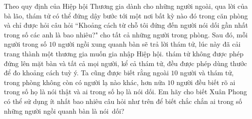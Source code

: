 \begin{multicols}{2}
\begin{figure}[H]
		\vspace*{-15pt}
	\end{figure}
	Theo quy định của Hiệp hội Thương gia dành cho những người ngoài, qua lời của bà lão, thám tử có thể đứng dậy bước tới một nơi bất kỳ nào đó trong căn phòng và chỉ được hỏi câu hỏi ``Khoảng cách từ chỗ tôi đứng đến người nói dối gần nhất trong số các anh là bao nhiêu?" cho tất cả những người trong phòng. Sau đó, mỗi người trong số $10$ người ngồi xung quanh bàn sẽ trả lời thám tử, lúc này đã cải trang thành một thương gia muốn gia nhập Hiệp hội. thám tử không được phép đứng lên mặt bàn và tất cả mọi người, kể cả thám tử, đều được phép dùng thước để đo khoảng cách tuỳ ý. Ta cũng được biết rằng ngoài $10$ người và thám tử, trong phòng không còn có người lạ nào khác, hơn nữa $10$ người đều biết rõ ai trong số họ là nói thật và ai trong số họ là nói dối. Em hãy cho biết Xuân Phong có thể sử dụng ít nhất bao nhiêu câu hỏi như trên để biết chắc chắn ai trong số những người ngồi quanh bàn là nói~dối?
\end{multicols}
\newpage
\begingroup
{} 
\centering
\endgroup
\vspace*{35pt}

